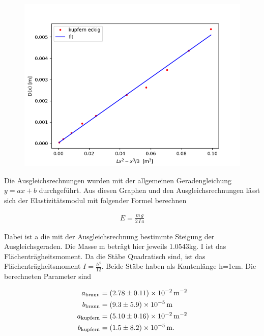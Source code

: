\begin{figure}[H]
    \centering
    \includegraphics{kee.png}
    \label{fig:kee}
\end{figure}

\noindent Die Ausgleichsrechnungen wurden mit der allgemeinen Geradengleichung $y = ax+b$ durchgeführt.
Aus diesen Graphen und den Ausgleichsrechnungen lässt sich der Elastizitätsmodul mit folgender Formel berechnen

\begin{align*}
    E = \frac{m\, g}{2\, I\, a}
\end{align*}

\noindent Dabei ist a die mit der Ausgleichsrechnung bestimmte Steigung der Ausgleichsgeraden. Die Masse m beträgt hier jeweils 1.0543kg.
I ist das Flächenträgheitsmoment. Da die Stäbe Quadratisch sind, ist das Flächenträgheitsmoment $I=\frac{h^4}{12}$.
Beide Stäbe haben als Kantenlänge h=1cm. Die berechneten Parameter sind

\begin{align*}
    a_\text{braun} &= \SI[separate-uncertainty=true]{2.78(0.11)E-2}{\per \square\metre} \\
    b_\text{braun} &= \SI[separate-uncertainty=true]{9.3(5.9)E-5}{\metre} \\
    a_\text{kupfern} &= \SI[separate-uncertainty=true]{5.10(0.16)E-2}{\per \square\metre}\\
    b_\text{kupfern} &= \SI[separate-uncertainty=true]{1.5(8.2)E-5}{\metre}.
\end{align*}

